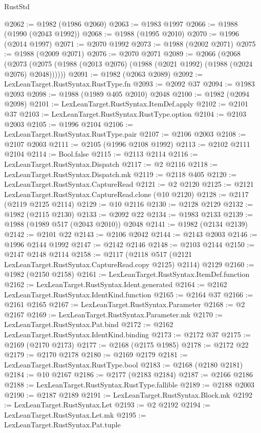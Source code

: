 \begin{lexlean}{RustStd}
\begin{coremodule}
@2062 := @1982 (@1986 @2060)
@2063 := @1983 @1997
@2066 := @1988 (@1990 (@2043 @1992))
@2068 := @1988 (@1995 @2010)
@2070 := @1996 (@2014 @1997)
@2071 := @2070 @1992
@2073 := @1988 (@2002 @2071)
@2075 := @1988 (@2009 @2071)
@2076 := @2070 @2071
@2089 := @2066
    (@2068 (@2073 (@2075 (@1988 (@2013 @2076) (@1988 (@2021 @1992) (@1988 (@2024 @2076) @2048))))))
@2091 := @1982 (@2063 @2089)
@2092 := LexLeanTarget.RustSyntax.RustType.fn
@2093 := @2092 @37
@2094 := @1983 @2093
@2098 := @1988 (@1989 @405 @2010) @2048
@2100 := @1982 (@2094 @2098)
@2101 := LexLeanTarget.RustSyntax.ItemDef.apply
@2102 := @2101 @37
@2103 := LexLeanTarget.RustSyntax.RustType.option
@2104 := @2103 @2003
@2105 := @1996 @2104
@2106 := LexLeanTarget.RustSyntax.RustType.pair
@2107 := @2106 @2003
@2108 := @2107 @2003
@2111 := @2105 (@1996 @2108 @1992)
@2113 := @2102 @2111 @2104
@2114 := Bool.false
@2115 := @2113 @2114
@2116 := LexLeanTarget.RustSyntax.Dispatch
@2117 := @2 @2116
@2118 := LexLeanTarget.RustSyntax.Dispatch.mk
@2119 := @2118 @405
@2120 := LexLeanTarget.RustSyntax.CaptureRead
@2121 := @2 @2120
@2125 := @2121 LexLeanTarget.RustSyntax.CaptureRead.clone (@10 @2120)
@2128 := @2117 (@2119 @2125 @2114)
@2129 := @10 @2116
@2130 := @2128 @2129
@2132 := @1982 (@2115 @2130)
@2133 := @2092 @22
@2134 := @1983 @2133
@2139 := @1988 (@1989 @517 (@2043 @2010)) @2048
@2141 := @1982 (@2134 @2139)
@2142 := @2101 @22
@2143 := @2106 @2042
@2144 := @2143 @2003
@2146 := @1996 @2144 @1992
@2147 := @2142 @2146
@2148 := @2103 @2144
@2150 := @2147 @2148 @2114
@2158 := @2117 (@2118 @517 (@2121 LexLeanTarget.RustSyntax.CaptureRead.copy @2125) @2114) @2129
@2160 := @1982 (@2150 @2158)
@2161 := LexLeanTarget.RustSyntax.ItemDef.function
@2162 := LexLeanTarget.RustSyntax.Ident.generated
@2164 := @2162 LexLeanTarget.RustSyntax.IdentKind.function
@2165 := @2164 @37
@2166 := @2161 @2165
@2167 := LexLeanTarget.RustSyntax.Parameter
@2168 := @2 @2167
@2169 := LexLeanTarget.RustSyntax.Parameter.mk
@2170 := LexLeanTarget.RustSyntax.Pat.bind
@2172 := @2162 LexLeanTarget.RustSyntax.IdentKind.binding
@2173 := @2172 @37
@2175 := @2169 (@2170 @2173)
@2177 := @2168 (@2175 @1985)
@2178 := @2172 @22
@2179 := @2170 @2178
@2180 := @2169 @2179
@2181 := LexLeanTarget.RustSyntax.RustType.bool
@2183 := @2168 (@2180 @2181)
@2184 := @10 @2167
@2186 := @2177 (@2183 @2184)
@2187 := @2166 @2186
@2188 := LexLeanTarget.RustSyntax.RustType.fallible
@2189 := @2188 @2003
@2190 := @2187 @2189
@2191 := LexLeanTarget.RustSyntax.Block.mk
@2192 := LexLeanTarget.RustSyntax.Let
@2193 := @2 @2192
@2194 := LexLeanTarget.RustSyntax.Let.mk
@2195 := LexLeanTarget.RustSyntax.Pat.tuple

\end{coremodule}
\end{lexlean}
